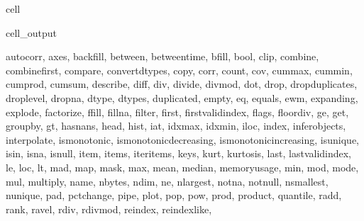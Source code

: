 \documentclass[letterpaper,10pt,english]{jupyterBook}
\begin{document}
\begin{sphinxuseclass}{cell}
\begin{sphinxVerbatimOutput}
\begin{sphinxuseclass}{cell_output}
\begin{sphinxVerbatim}[commandchars=\\\{\}]
\PYGZsq{}autocorr\PYGZsq{}, \PYGZsq{}axes\PYGZsq{}, \PYGZsq{}backfill\PYGZsq{}, \PYGZsq{}between\PYGZsq{}, \PYGZsq{}between\PYGZus{}time\PYGZsq{}, \PYGZsq{}bfill\PYGZsq{}, \PYGZsq{}bool\PYGZsq{}, \PYGZsq{}clip\PYGZsq{}, \PYGZsq{}combine\PYGZsq{}, \PYGZsq{}combine\PYGZus{}first\PYGZsq{}, \PYGZsq{}compare\PYGZsq{}, \PYGZsq{}convert\PYGZus{}dtypes\PYGZsq{}, \PYGZsq{}copy\PYGZsq{}, \PYGZsq{}corr\PYGZsq{}, \PYGZsq{}count\PYGZsq{}, \PYGZsq{}cov\PYGZsq{}, \PYGZsq{}cummax\PYGZsq{}, \PYGZsq{}cummin\PYGZsq{}, \PYGZsq{}cumprod\PYGZsq{}, \PYGZsq{}cumsum\PYGZsq{}, \PYGZsq{}describe\PYGZsq{}, \PYGZsq{}diff\PYGZsq{}, \PYGZsq{}div\PYGZsq{}, \PYGZsq{}divide\PYGZsq{}, \PYGZsq{}divmod\PYGZsq{}, \PYGZsq{}dot\PYGZsq{}, \PYGZsq{}drop\PYGZsq{}, \PYGZsq{}drop\PYGZus{}duplicates\PYGZsq{}, \PYGZsq{}droplevel\PYGZsq{}, \PYGZsq{}dropna\PYGZsq{}, \PYGZsq{}dtype\PYGZsq{}, \PYGZsq{}dtypes\PYGZsq{}, \PYGZsq{}duplicated\PYGZsq{}, \PYGZsq{}empty\PYGZsq{}, \PYGZsq{}eq\PYGZsq{}, \PYGZsq{}equals\PYGZsq{}, \PYGZsq{}ewm\PYGZsq{}, \PYGZsq{}expanding\PYGZsq{}, \PYGZsq{}explode\PYGZsq{}, \PYGZsq{}factorize\PYGZsq{}, \PYGZsq{}ffill\PYGZsq{}, \PYGZsq{}fillna\PYGZsq{}, \PYGZsq{}filter\PYGZsq{}, \PYGZsq{}first\PYGZsq{}, \PYGZsq{}first\PYGZus{}valid\PYGZus{}index\PYGZsq{}, \PYGZsq{}flags\PYGZsq{}, \PYGZsq{}floordiv\PYGZsq{}, \PYGZsq{}ge\PYGZsq{}, \PYGZsq{}get\PYGZsq{}, \PYGZsq{}groupby\PYGZsq{}, \PYGZsq{}gt\PYGZsq{}, \PYGZsq{}hasnans\PYGZsq{}, \PYGZsq{}head\PYGZsq{}, \PYGZsq{}hist\PYGZsq{}, \PYGZsq{}iat\PYGZsq{}, \PYGZsq{}idxmax\PYGZsq{}, \PYGZsq{}idxmin\PYGZsq{}, \PYGZsq{}iloc\PYGZsq{}, \PYGZsq{}index\PYGZsq{}, \PYGZsq{}infer\PYGZus{}objects\PYGZsq{}, \PYGZsq{}interpolate\PYGZsq{}, \PYGZsq{}is\PYGZus{}monotonic\PYGZsq{}, \PYGZsq{}is\PYGZus{}monotonic\PYGZus{}decreasing\PYGZsq{}, \PYGZsq{}is\PYGZus{}monotonic\PYGZus{}increasing\PYGZsq{}, \PYGZsq{}is\PYGZus{}unique\PYGZsq{}, \PYGZsq{}isin\PYGZsq{}, \PYGZsq{}isna\PYGZsq{}, \PYGZsq{}isnull\PYGZsq{}, \PYGZsq{}item\PYGZsq{}, \PYGZsq{}items\PYGZsq{}, \PYGZsq{}iteritems\PYGZsq{}, \PYGZsq{}keys\PYGZsq{}, \PYGZsq{}kurt\PYGZsq{}, \PYGZsq{}kurtosis\PYGZsq{}, \PYGZsq{}last\PYGZsq{}, \PYGZsq{}last\PYGZus{}valid\PYGZus{}index\PYGZsq{}, \PYGZsq{}le\PYGZsq{}, \PYGZsq{}loc\PYGZsq{}, \PYGZsq{}lt\PYGZsq{}, \PYGZsq{}mad\PYGZsq{}, \PYGZsq{}map\PYGZsq{}, \PYGZsq{}mask\PYGZsq{}, \PYGZsq{}max\PYGZsq{}, \PYGZsq{}mean\PYGZsq{}, \PYGZsq{}median\PYGZsq{}, \PYGZsq{}memory\PYGZus{}usage\PYGZsq{}, \PYGZsq{}min\PYGZsq{}, \PYGZsq{}mod\PYGZsq{}, \PYGZsq{}mode\PYGZsq{}, \PYGZsq{}mul\PYGZsq{}, \PYGZsq{}multiply\PYGZsq{}, \PYGZsq{}name\PYGZsq{}, \PYGZsq{}nbytes\PYGZsq{}, \PYGZsq{}ndim\PYGZsq{}, \PYGZsq{}ne\PYGZsq{}, \PYGZsq{}nlargest\PYGZsq{}, \PYGZsq{}notna\PYGZsq{}, \PYGZsq{}notnull\PYGZsq{}, \PYGZsq{}nsmallest\PYGZsq{}, \PYGZsq{}nunique\PYGZsq{}, \PYGZsq{}pad\PYGZsq{}, \PYGZsq{}pct\PYGZus{}change\PYGZsq{}, \PYGZsq{}pipe\PYGZsq{}, \PYGZsq{}plot\PYGZsq{}, \PYGZsq{}pop\PYGZsq{}, \PYGZsq{}pow\PYGZsq{}, \PYGZsq{}prod\PYGZsq{}, \PYGZsq{}product\PYGZsq{}, \PYGZsq{}quantile\PYGZsq{}, \PYGZsq{}radd\PYGZsq{}, \PYGZsq{}rank\PYGZsq{}, \PYGZsq{}ravel\PYGZsq{}, \PYGZsq{}rdiv\PYGZsq{}, \PYGZsq{}rdivmod\PYGZsq{}, \PYGZsq{}reindex\PYGZsq{}, \PYGZsq{}reindex\PYGZus{}like\PYGZsq{}, 
\end{sphinxVerbatim}
\end{sphinxuseclass}
\end{sphinxVerbatimOutput}
\end{sphinxuseclass}
\end{document}
